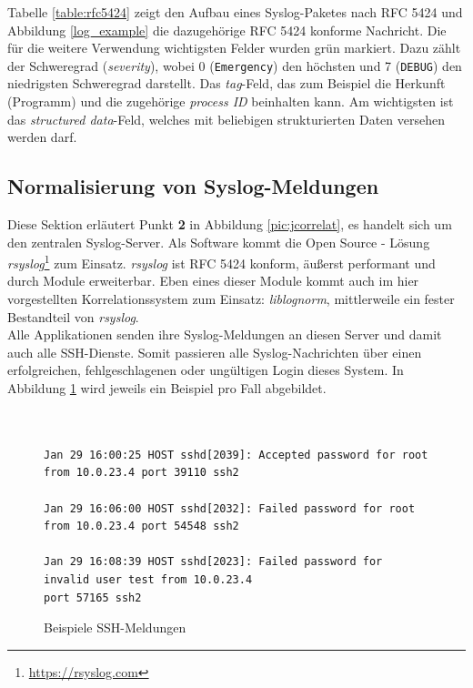 Tabelle \ref{table:rfc5424} zeigt den Aufbau eines Syslog-Paketes nach RFC 5424 und 
Abbildung \ref{log_example} die dazugehörige RFC 5424 konforme Nachricht. Die für 
die weitere Verwendung wichtigsten Felder wurden grün markiert. Dazu zählt der 
Schweregrad (\textit{severity}), wobei 0 (\texttt{Emergency}) den höchsten und 7 
(\texttt{DEBUG}) den niedrigsten Schweregrad darstellt. Das \textit{tag}-Feld, das zum 
Beispiel die Herkunft (Programm) und die zugehörige \textit{process ID} beinhalten kann. 
Am wichtigsten ist das \textit{structured data}-Feld, welches mit beliebigen 
strukturierten Daten versehen werden darf.

\subsection{Normalisierung von Syslog-Meldungen}\label{syslog-konsolidierung}

Diese Sektion erläutert Punkt \textbf{2} in Abbildung \ref{pic:jcorrelat}, es handelt 
sich um den zentralen Syslog-Server. Als Software kommt die Open Source - Lösung 
\textit{rsyslog}\footnote{\url{https://rsyslog.com}} zum Einsatz. \textit{rsyslog} ist 
RFC 5424 konform, äußerst performant und durch Module erweiterbar. Eben eines dieser 
Module kommt auch im hier vorgestellten Korrelationssystem zum Einsatz: 
\textit{liblognorm}, mittlerweile ein fester Bestandteil von \textit{rsyslog}.\\ 

Alle Applikationen senden ihre Syslog-Meldungen an diesen Server und damit auch alle 
SSH-Dienste. Somit passieren alle Syslog-Nachrichten über einen erfolgreichen, 
fehlgeschlagenen oder ungültigen Login dieses System. In Abbildung \ref{ssh_example} wird 
jeweils ein Beispiel pro Fall abgebildet.

\begin{figure}[h]
    \caption{Beispiele SSH-Meldungen}
    \label{ssh_example}\vspace{0.2cm}
    \centering
    \begin{shaded*}
    \small{      
        \begin{verbatim}        


Jan 29 16:00:25 HOST sshd[2039]: Accepted password for root from 10.0.23.4 port 39110 ssh2
        
Jan 29 16:06:00 HOST sshd[2032]: Failed password for root from 10.0.23.4 port 54548 ssh2

Jan 29 16:08:39 HOST sshd[2023]: Failed password for invalid user test from 10.0.23.4 
port 57165 ssh2
\end{verbatim}}
\end{shaded*}
\end{figure}

